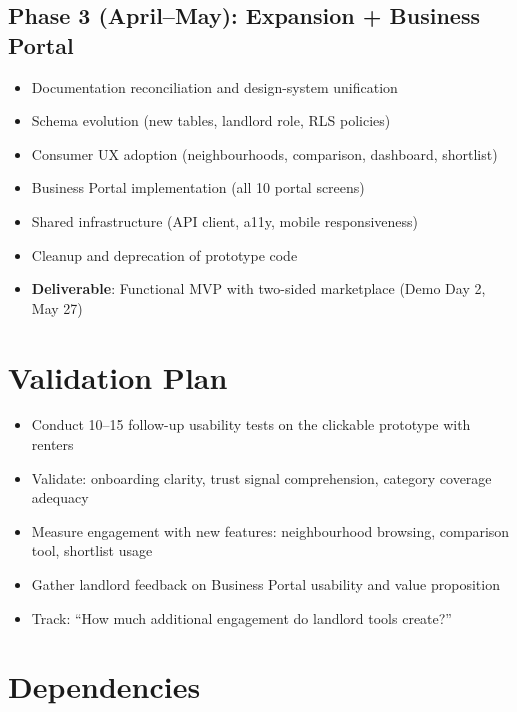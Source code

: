 \documentclass[11pt,letterpaper]{article}
\begin{document}
\subsection{Phase 3 (April--May): Expansion + Business Portal}
\begin{itemize}
    \item Documentation reconciliation and design-system unification
    \item Schema evolution (new tables, landlord role, RLS policies)
    \item Consumer UX adoption (neighbourhoods, comparison, dashboard, shortlist)
    \item Business Portal implementation (all 10 portal screens)
    \item Shared infrastructure (API client, a11y, mobile responsiveness)
    \item Cleanup and deprecation of prototype code
    \item \textbf{Deliverable}: Functional MVP with two-sided marketplace (Demo Day 2, May 27)
\end{itemize}

\section{Validation Plan}

\begin{itemize}
    \item Conduct 10--15 follow-up usability tests on the clickable prototype with renters
    \item Validate: onboarding clarity, trust signal comprehension, category coverage adequacy
    \item Measure engagement with new features: neighbourhood browsing, comparison tool, shortlist usage
    \item Gather landlord feedback on Business Portal usability and value proposition
    \item Track: ``How much additional engagement do landlord tools create?''
\end{itemize}

\section{Dependencies}
\end{document}
